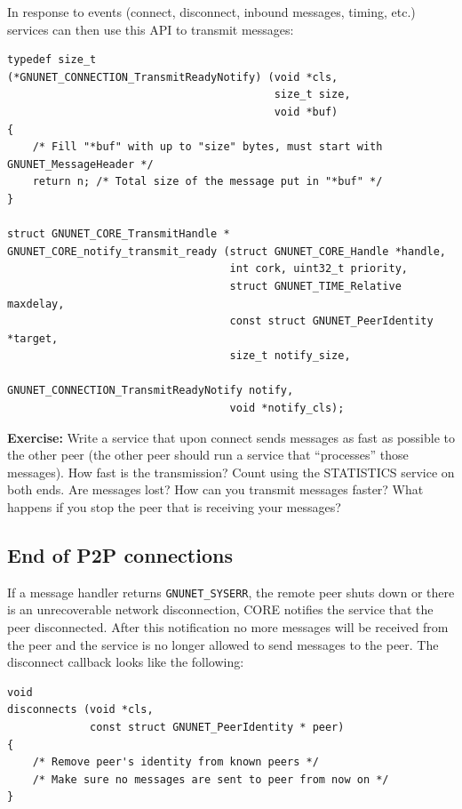 \documentclass[10pt]{article}
\newcommand{\exercise}[1]{\noindent\begin{boxedminipage}{\textwidth}{\bf Exercise:} #1 \end{boxedminipage}}
\begin{document}
In response to events (connect, disconnect, inbound messages, 
timing, etc.) services can then use this API to transmit messages:

\lstset{language=C}
\begin{lstlisting}
typedef size_t 
(*GNUNET_CONNECTION_TransmitReadyNotify) (void *cls,
                                          size_t size, 
                                          void *buf)
{
    /* Fill "*buf" with up to "size" bytes, must start with GNUNET_MessageHeader */
    return n; /* Total size of the message put in "*buf" */
}

struct GNUNET_CORE_TransmitHandle *
GNUNET_CORE_notify_transmit_ready (struct GNUNET_CORE_Handle *handle,
                                   int cork, uint32_t priority,
                                   struct GNUNET_TIME_Relative maxdelay,
                                   const struct GNUNET_PeerIdentity *target,
                                   size_t notify_size,
                                   GNUNET_CONNECTION_TransmitReadyNotify notify,
                                   void *notify_cls);
\end{lstlisting}

\exercise{Write a service that upon connect sends messages as
fast as possible to the other peer (the other peer should run a
service that ``processes'' those messages).  How fast is the
transmission?  Count using the STATISTICS service on both ends.  Are
messages lost? How can you transmit messages faster?  What happens if
you stop the peer that is receiving your messages?}


\subsection{End of P2P connections}

If a message handler returns {\tt GNUNET\_SYSERR}, the remote peer shuts down or
there is an unrecoverable network disconnection, CORE notifies the service that
the peer disconnected. After this notification no more messages will be received
from the peer and the service is no longer allowed to send messages to the peer.
The disconnect callback looks like the following:

\lstset{language=C}
\begin{lstlisting}
void
disconnects (void *cls,
             const struct GNUNET_PeerIdentity * peer)
{
    /* Remove peer's identity from known peers */
    /* Make sure no messages are sent to peer from now on */
}
\end{lstlisting}
\end{document}
